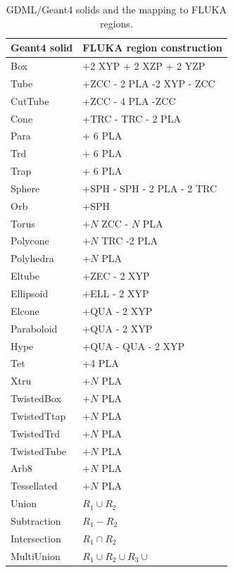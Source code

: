 \documentclass[final,5p,times,twocolumn]{elsarticle}
\begin{document}
\begin{table}[hbt!]
\centering
\begin{tabular}{ l  l  } \hline
Geant4 solid			& FLUKA region construction		\\ \hline
Box					& +2 XYP + 2 XZP + 2 YZP 		\\
Tube					& +ZCC - 2 PLA -2 XYP - ZCC	 	\\
CutTube				& +ZCC - 4 PLA -ZCC			\\
Cone				& +TRC - TRC - 2 PLA 			\\
Para					& + 6 PLA						\\
Trd					& + 6 PLA						\\
Trap					& + 6 PLA						\\
Sphere				& +SPH - SPH  - 2 PLA - 2 TRC	\\
Orb					& +SPH						\\
Torus				& +$N$ ZCC  - $N$ PLA			\\
Polycone				& +$N$ TRC -2 PLA				\\
Polyhedra				& +$N$ PLA					\\
Eltube				& +ZEC  - 2 XYP				\\
Ellipsoid				& +ELL - 2 XYP		 			\\
Elcone				& +QUA - 2 XYP				\\
Paraboloid			& +QUA - 2 XYP				\\
Hype					& +QUA - QUA - 2 XYP			\\
Tet					& +4 PLA						\\
Xtru					& +$N$ PLA \\
TwistedBox			& +$N$ PLA					\\
TwistedTtap			& +$N$ PLA					\\
TwistedTrd			& +$N$ PLA				 	\\
TwistedTube			& +$N$ PLA					\\
Arb8					& +$N$ PLA					\\
Tessellated			& +$N$ PLA				 	\\
Union				& $R_1 \cup R_2$				\\
Subtraction			& $R_1 - R_2$					\\
Intersection			& $R_1 \cap R_2$				\\
MultiUnion			& $R_1 \cup R_2 \cup R_3 \cup$	\\ \hline
\end{tabular}
\label{tab:geant2fluka}
\caption{GDML/Geant4 solids and the mapping to FLUKA regions.}
\end{table}
\end{document}
